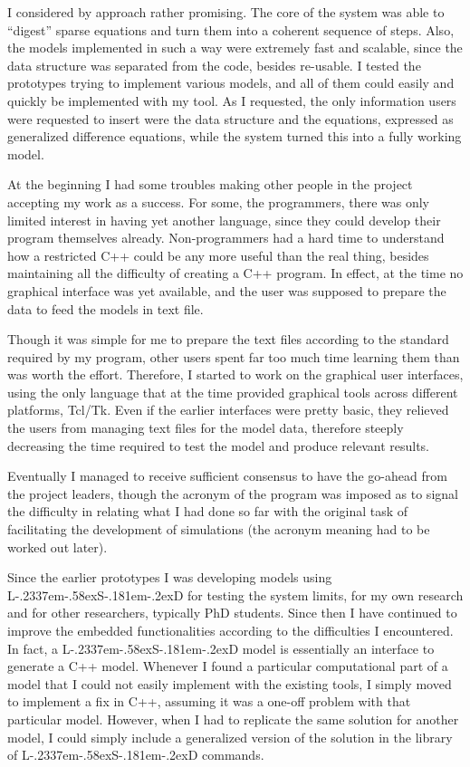 \documentclass [11pt,a4paper] {book}
\def\LsD{{L\kern-.2337em\lower-.58ex\hbox{S}\kern-.181em\lower-.2ex\hbox{D}}\xspace}
\begin{document}
I considered by approach rather promising. The core of the system was able to ``digest'' sparse equations and turn them into a coherent sequence of steps. Also, the models implemented in such a way were extremely fast and scalable, since the data structure was separated from the code, besides re-usable. I tested the prototypes trying to implement various models, and all of them could easily and quickly be implemented with my tool. As I requested, the only information users were requested to insert were the data structure and the equations, expressed as generalized difference equations, while the system turned this into a fully working model. 

At the beginning I had some troubles making other people in the project accepting my work as a success. For some, the programmers, there was only limited interest in having yet another language, since they could develop their program themselves already. Non-programmers had a hard time to understand how a restricted C++ could be any more useful than the real thing, besides maintaining all the difficulty of creating a C++ program. In effect, at the time no graphical interface was yet available, and the user was supposed to prepare the data to feed the models in text file. 

Though it was simple for me to prepare the text files according to the standard required by my program, other users spent far too much time learning them than was worth the effort. Therefore, I started to work on the graphical user interfaces, using the only language that at the time provided graphical tools across different platforms, Tcl/Tk. Even if the earlier interfaces were pretty basic, they relieved the users from managing text files for the model data, therefore steeply decreasing the time required to test the model and produce relevant results.

Eventually I managed to receive sufficient consensus to have the go-ahead from the project leaders, though the acronym of the program was imposed as to signal the difficulty in relating what I had done so far with the original task of facilitating the development of simulations (the acronym meaning had to be worked out later). 

Since the earlier prototypes I was developing models using \LsD for testing the system limits, for my own research and for other researchers, typically PhD students. Since then I have continued to improve the embedded functionalities according to the difficulties I encountered. In fact, a \LsD model is essentially an interface to generate a C++ model. Whenever I found a particular computational part of a model that I could not easily implement with the existing tools, I simply moved to implement a fix in C++, assuming it was a one-off problem with that particular model. However, when I had to replicate the same solution for another model, I could simply include a generalized version of the solution in the library of \LsD commands.
\end{document}
